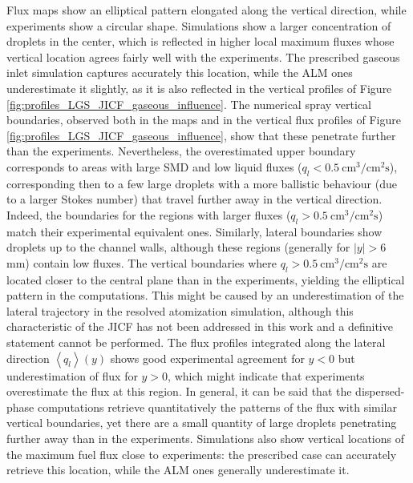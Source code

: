 Flux maps show an elliptical pattern elongated along the vertical direction, while experiments show a circular shape. Simulations show a larger concentration of droplets in the center, which is reflected in higher local maximum fluxes whose vertical location agrees fairly well with the experiments. The prescribed gaseous inlet simulation captures accurately this location, while the ALM ones underestimate it slightly, as it is also reflected in the vertical profiles of Figure \ref{fig:profiles_LGS_JICF_gaseous_influence}.  The numerical spray vertical boundaries, observed both in the maps and in the vertical flux profiles of Figure \ref{fig:profiles_LGS_JICF_gaseous_influence}, show that these penetrate further than the experiments. Nevertheless, the overestimated upper boundary corresponds to areas with large SMD and low liquid fluxes ($q_l < 0.5~\mathrm{cm}^3/\mathrm{cm}^2\mathrm{s}$), corresponding then to a few large droplets with a more ballistic behaviour (due to a larger Stokes number) that travel further away in the vertical direction. Indeed, the boundaries for the regions with larger fluxes ($q_l > 0.5~\mathrm{cm}^3/\mathrm{cm}^2\mathrm{s}$) match their experimental equivalent ones. Similarly, lateral boundaries show droplets up to the channel walls, although these regions (generally for $|y| > 6$ mm) contain low fluxes. The vertical boundaries where $q_l > 0.5~\mathrm{cm}^3/\mathrm{cm}^2\mathrm{s}$ are located closer to the central plane than in the experiments, yielding the elliptical pattern in the computations. This might be caused by an underestimation of the lateral trajectory in the resolved atomization simulation, although this characteristic of the JICF has not been addressed in this work and a definitive statement cannot be performed. The flux profiles integrated along the lateral  direction $\left\langle q_l \right\rangle \left( y \right)$ shows good experimental agreement for $y < 0$ but underestimation of flux for $y > 0$, which might indicate that experiments overestimate the flux at this region. In general, it can be said that the dispersed-phase computations retrieve quantitatively the patterns of the flux with similar vertical boundaries, yet there are a small quantity of large droplets penetrating further away than in the experiments. Simulations also show vertical locations of the maximum fuel flux close to experiments: the prescribed case can accurately retrieve this location, while the ALM ones generally underestimate it.


